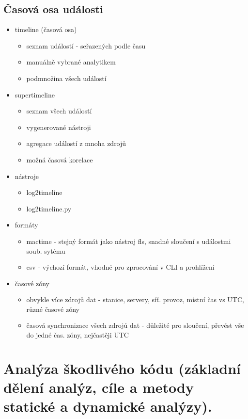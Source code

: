 \subsection{Časová osa události}
\begin{itemize}
    \item timeline (časová osa)
    \begin{itemize}
        \item seznam událostí - seřazených podle času
        \item manuálně vybrané analytikem
        \item podmnožina všech událostí
    \end{itemize}
    \item supertimeline
    \begin{itemize}
        \item seznam všech událostí
        \item vygenerované nástroji
        \item agregace událostí z mnoha zdrojů
        \item možná časová korelace \\
    \end{itemize}
    \item nástroje
    \begin{itemize}
        \item log2timeline
        \item log2timeline.py
    \end{itemize}
    \item formáty
    \begin{itemize}
        \item mactime - stejný formát jako nástroj fls, snadné sloučení s událostmi soub. sytému
        \item csv - výchozí formát, vhodné pro zpracování v CLI a prohlížení
    \end{itemize}
    \item časové zóny
    \begin{itemize}
        \item obvykle více zdrojů dat - stanice, servery, síť. provoz, místní čas vs UTC, různé časové zóny
        \item časová synchronizace všech zdrojů dat - důležité pro sloučení, převést vše do jedné čas. zóny, nejčastěji UTC
    \end{itemize}
\end{itemize}


\clearpage
\section{Analýza škodlivého kódu (základní dělení analýz, cíle a metody statické a dynamické analýzy).}

